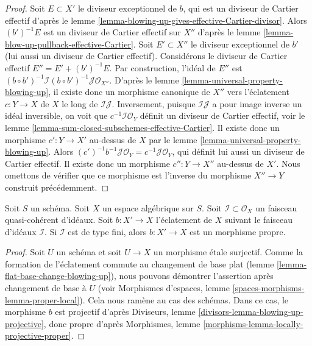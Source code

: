 \begin{proof}
Soit $E \subset X'$ le diviseur exceptionnel de $b$, qui est un diviseur de
Cartier effectif d'après le
lemme \ref{lemma-blowing-up-gives-effective-Cartier-divisor}.
Alors $(b')^{-1}E$ est un diviseur de Cartier effectif sur $X''$ d'après le
lemme \ref{lemma-blow-up-pullback-effective-Cartier}.
Soit $E' \subset X''$ le diviseur exceptionnel de $b'$ (lui aussi un diviseur de
Cartier effectif). Considérons le diviseur de Cartier effectif
$E'' = E' + (b')^{-1}E$. Par construction, l'idéal de $E''$ est
$(b \circ b')^{-1}\mathcal{I} (b \circ b')^{-1}\mathcal{J} \mathcal{O}_{X''}$.
D'après le lemme \ref{lemma-universal-property-blowing-up},
il existe donc un morphisme canonique de $X''$ vers l'éclatement $c : Y \to X$
de $X$ le long de $\mathcal{I}\mathcal{J}$. Inversement, puisque $\mathcal{I}\mathcal{J}$
a pour image inverse un idéal inversible, on voit que
$c^{-1}\mathcal{I}\mathcal{O}_Y$ définit
un diviseur de Cartier effectif, voir le
lemme \ref{lemma-sum-closed-subschemes-effective-Cartier}.
Il existe donc un morphisme $c' : Y \to X'$ au-dessus de $X$ par le
lemme \ref{lemma-universal-property-blowing-up}.
Alors $(c')^{-1}b^{-1}\mathcal{J}\mathcal{O}_Y = c^{-1}\mathcal{J}\mathcal{O}_Y$,
qui définit lui aussi un diviseur de Cartier effectif. Il existe donc un morphisme
$c'' : Y \to X''$ au-dessus de $X'$. Nous omettons de vérifier que ce
morphisme est l'inverse du morphisme $X'' \to Y$ construit précédemment.
\end{proof}

\begin{lemma}
\label{lemma-blowing-up-projective}
Soit $S$ un schéma. Soit $X$ un espace algébrique sur $S$.
Soit $\mathcal{I} \subset \mathcal{O}_X$ un faisceau quasi-cohérent
d'idéaux. Soit $b : X' \to X$ l'éclatement de $X$
suivant le faisceau d'idéaux $\mathcal{I}$. Si $\mathcal{I}$ est de type fini, alors
$b : X' \to X$ est un morphisme propre.
\end{lemma}

\begin{proof}
Soit $U$ un schéma et soit $U \to X$ un morphisme \'etale surjectif.
Comme la formation de l'éclatement commute au changement de base plat
(lemme \ref{lemma-flat-base-change-blowing-up}),
nous pouvons démontrer l'assertion après changement de base à $U$
(voir Morphismes d'espaces, lemme
\ref{spaces-morphisms-lemma-proper-local}).
Cela nous ramène au cas des schémas.
Dans ce cas, le morphisme $b$ est projectif d'après
Diviseurs, lemme \ref{divisors-lemma-blowing-up-projective},
donc propre d'après
Morphismes, lemme \ref{morphisms-lemma-locally-projective-proper}.
\end{proof}


